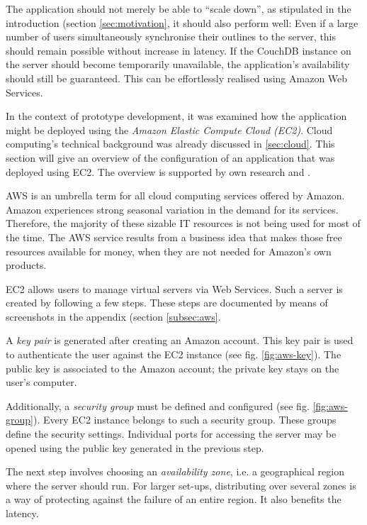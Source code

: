 The application should not merely be able to \enquote{scale down}, as stipulated in the introduction (section \ref{sec:motivation}, it should also perform well: Even if a large number of users simultaneously synchronise their outlines to the server, this should remain possible without increase in latency. If the CouchDB instance on the server should become temporarily unavailable, the application's availability should still be guaranteed. This can be effortlessly realised using Amazon Web Services.

In the context of prototype development, it was examined how the application might be deployed using the \textit{Amazon Elastic Compute Cloud (EC2)}. Cloud computing's technical background was already discussed in \ref{sec:cloud}. This section will give an overview of the configuration of an application that was deployed using EC2. The overview is supported by own research and .

AWS is an umbrella term for all cloud computing services offered by Amazon. Amazon experiences strong seasonal variation in the demand for its services. Therefore, the majority of these sizable IT resources is not being used for most of the time. The AWS service results from a business idea that makes those free resources available for money, when they are not needed for Amazon's own products.

EC2 allows users to manage virtual servers via Web Services. Such a server is created by following a few steps. These steps are documented by means of screenshots in the appendix (section \ref{subsec:aws}.

A \textit{key pair} is generated after creating an Amazon account. This key pair is used to authenticate the user against the EC2 instance (see fig. \ref{fig:aws-key}). The public key is associated to the Amazon account; the private key stays on the user's computer.

Additionally, a \textit{security group} must be defined and configured (see fig. \ref{fig:aws-group}). Every EC2 instance belongs to such a security group. These groups define the security settings. Individual ports for accessing the server may be opened using the public key generated in the previous step.

The next step involves choosing an \textit{availability zone}, i.e. a geographical region where the server should run. For larger set-ups, distributing over several zones is a way of protecting against the failure of an entire region. It also benefits the latency.

